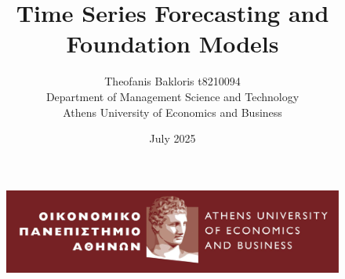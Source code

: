 \documentclass{article}
\begin{document}
\begin{figure}
    \includegraphics[width=1\linewidth]{images/1_AUEB-pantone-HR.jpg}
\label{fig:enter-label}
\end{figure}


\title{\textbf{Time Series Forecasting and Foundation Models}}
\author{Theofanis Bakloris t8210094\\
Department of Management Science and Technology \\
Athens University of Economics and Business}
\date{July 2025}

\newpage
\maketitle
\tableofcontents 

\newpage
\end{document}
